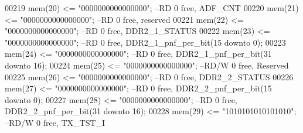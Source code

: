 \begin{DoxyCode}
00219             \textcolor{vhdlchar}{mem}\textcolor{vhdlchar}{(}\textcolor{vhdllogic}{}\textcolor{vhdllogic}{20}\textcolor{vhdlchar}{)} \textcolor{vhdlchar}{<=} \textcolor{vhdllogic}{"0000000000000000"};\textcolor{keyword}{ --RD 0 free, ADF\_CNT         }
00220             \textcolor{vhdlchar}{mem}\textcolor{vhdlchar}{(}\textcolor{vhdllogic}{}\textcolor{vhdllogic}{21}\textcolor{vhdlchar}{)} \textcolor{vhdlchar}{<=} \textcolor{vhdllogic}{"0000000000000000"};\textcolor{keyword}{ --RD 0 free, reserved}
00221             \textcolor{vhdlchar}{mem}\textcolor{vhdlchar}{(}\textcolor{vhdllogic}{}\textcolor{vhdllogic}{22}\textcolor{vhdlchar}{)} \textcolor{vhdlchar}{<=} \textcolor{vhdllogic}{"0000000000000000"};\textcolor{keyword}{ --RD   0 free, DDR2\_1\_STATUS}
00222             \textcolor{vhdlchar}{mem}\textcolor{vhdlchar}{(}\textcolor{vhdllogic}{}\textcolor{vhdllogic}{23}\textcolor{vhdlchar}{)} \textcolor{vhdlchar}{<=} \textcolor{vhdllogic}{"0000000000000000"};\textcolor{keyword}{ --RD 0 free, DDR2\_1\_pnf\_per\_bit(15 downto 0);}
00223             \textcolor{vhdlchar}{mem}\textcolor{vhdlchar}{(}\textcolor{vhdllogic}{}\textcolor{vhdllogic}{24}\textcolor{vhdlchar}{)} \textcolor{vhdlchar}{<=} \textcolor{vhdllogic}{"0000000000000000"};\textcolor{keyword}{ --RD   0 free, DDR2\_1\_pnf\_per\_bit(31 downto 16);}
00224             \textcolor{vhdlchar}{mem}\textcolor{vhdlchar}{(}\textcolor{vhdllogic}{}\textcolor{vhdllogic}{25}\textcolor{vhdlchar}{)} \textcolor{vhdlchar}{<=} \textcolor{vhdllogic}{"0000000000000000"};\textcolor{keyword}{ --RD/W 0 free, Reserved}
00225             \textcolor{vhdlchar}{mem}\textcolor{vhdlchar}{(}\textcolor{vhdllogic}{}\textcolor{vhdllogic}{26}\textcolor{vhdlchar}{)} \textcolor{vhdlchar}{<=} \textcolor{vhdllogic}{"0000000000000000"};\textcolor{keyword}{ --RD   0 free, DDR2\_2\_STATUS}
00226             \textcolor{vhdlchar}{mem}\textcolor{vhdlchar}{(}\textcolor{vhdllogic}{}\textcolor{vhdllogic}{27}\textcolor{vhdlchar}{)} \textcolor{vhdlchar}{<=} \textcolor{vhdllogic}{"0000000000000000"};\textcolor{keyword}{ --RD   0 free, DDR2\_2\_pnf\_per\_bit(15 downto 0);}
00227             \textcolor{vhdlchar}{mem}\textcolor{vhdlchar}{(}\textcolor{vhdllogic}{}\textcolor{vhdllogic}{28}\textcolor{vhdlchar}{)} \textcolor{vhdlchar}{<=} \textcolor{vhdllogic}{"0000000000000000"};\textcolor{keyword}{ --RD 0 free, DDR2\_2\_pnf\_per\_bit(31 downto 16);}
00228             \textcolor{vhdlchar}{mem}\textcolor{vhdlchar}{(}\textcolor{vhdllogic}{}\textcolor{vhdllogic}{29}\textcolor{vhdlchar}{)} \textcolor{vhdlchar}{<=} \textcolor{vhdllogic}{"1010101010101010"};\textcolor{keyword}{ --RD/W 0 free, TX\_TST\_I}

\end{DoxyCode}
